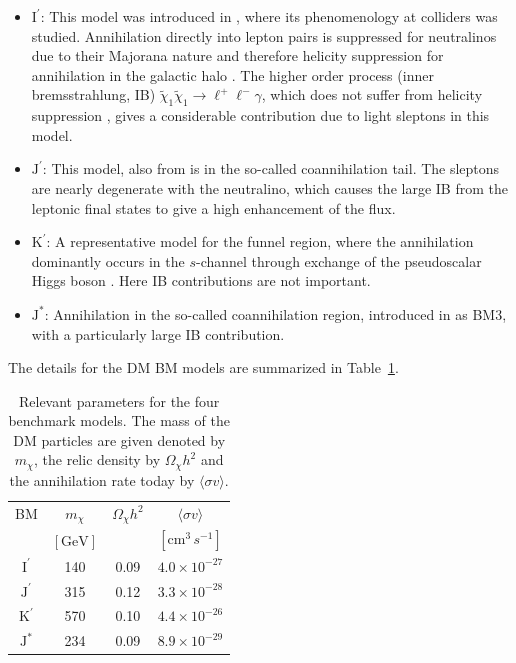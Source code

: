 \documentclass[10pt,aps,pra,reprint,amsmath,amsfonts,amssymb,showpacs,nofootinbib,floatfix]{revtex4-1}
\newcommand{\rmn}{\mathrm}
\newcommand{\Kp}{\rmn{K}^\prime}
\newcommand{\Ip}{\rmn{I}^\prime}
\newcommand{\Js}{\rmn{J}^*}
\newcommand{\Jp}{\rmn{J}^\prime}
\newcommand{\sigmaannv}{\ensuremath{\langle\sigma v\rangle}}
\begin{document}
\begin{itemize}
\item
 $\Ip$: This model was introduced in \cite{2004EPJC...33..273B}, where
  its phenomenology at colliders was studied. Annihilation directly
  into lepton pairs is suppressed for neutralinos due to their
  Majorana nature and therefore helicity suppression for annihilation
  in the galactic halo \cite{1983PhRvL..50.1419G}. The higher order
  process (inner bremsstrahlung, IB) $\tilde\chi_1\tilde\chi_1\to
  \ell^+\ell^-\gamma$, which does not suffer from helicity suppression
  \cite{1989PhLB..225..372B,2008JHEP...01..049B}, gives a considerable
  contribution due to light sleptons in this model.

\item $\Jp$: This model, also from \cite{2004EPJC...33..273B} is in the
  so-called coannihilation tail. The sleptons are nearly degenerate
  with the neutralino, which causes the large IB from the leptonic
  final states to give a high enhancement of the flux.

\item $\Kp$: A representative model for the funnel region, where the
  annihilation dominantly occurs in the $s$-channel through exchange
  of the pseudoscalar Higgs boson \cite{2004EPJC...33..273B}. Here IB
  contributions are not important.

\item $\Js$: Annihilation in the so-called coannihilation region,
  introduced in \cite{2008JHEP...01..049B} as BM3, with a particularly
  large IB contribution.

\end{itemize}

The details for the DM BM models are summarized in Table~\ref{tab:BMpara}.

\begin{table}
\begin{tabular}{cccc}
\hline\hline
      BM &  $m_{\chi}$     & $\Omega_{\chi} h^2$ & $\sigmaannv$\\
         &  $[\rmn{GeV}]$ &                    & $[\rmn{cm}^3\,s^{-1}]$\\
\hline
$\Ip$  & 140 & 0.09 & $4.0\times 10^{-27}$ \\
$\Jp$  & 315 & 0.12 & $3.3\times 10^{-28}$ \\
$\Kp$  & 570 & 0.10 & $4.4\times 10^{-26}$ \\
$\Js$  & 234 & 0.09 & $8.9\times 10^{-29}$ \\
\hline\hline
\end{tabular}
 \caption{Relevant parameters for the four benchmark models. The mass
   of the DM particles are given denoted by $m_{\chi}$, the relic
   density by $\Omega_{\chi} h^2$ and the annihilation rate today by
   $\sigmaannv$.\label{tab:BMpara}}
\end{table}
\end{document}
